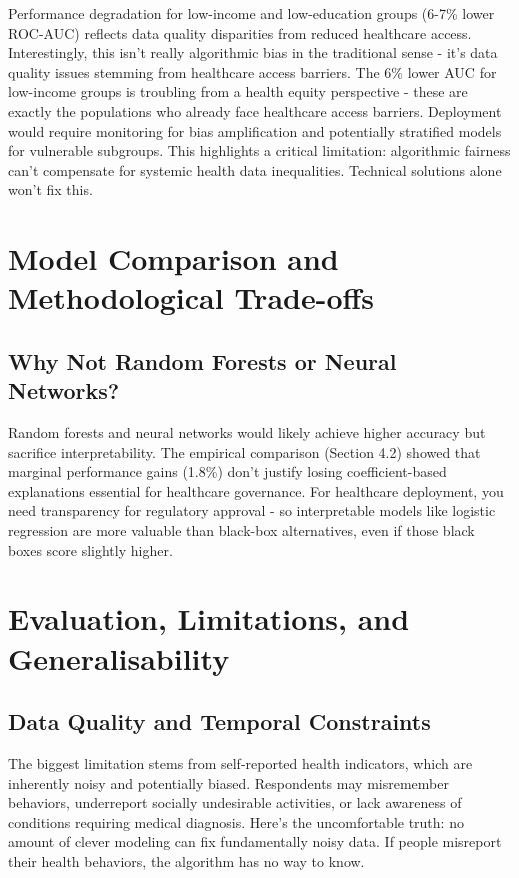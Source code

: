 \documentclass[12pt,a4paper]{article}
\begin{document}
Performance degradation for low-income and low-education groups (6-7\% lower ROC-AUC) reflects data quality disparities from reduced healthcare access. Interestingly, this isn't really algorithmic bias in the traditional sense - it's data quality issues stemming from healthcare access barriers. The 6\% lower AUC for low-income groups is troubling from a health equity perspective - these are exactly the populations who already face healthcare access barriers. Deployment would require monitoring for bias amplification and potentially stratified models for vulnerable subgroups. This highlights a critical limitation: algorithmic fairness can't compensate for systemic health data inequalities. Technical solutions alone won't fix this.

\section{Model Comparison and Methodological Trade-offs}

\subsection{Why Not Random Forests or Neural Networks?}

Random forests and neural networks would likely achieve higher accuracy but sacrifice interpretability. The empirical comparison (Section 4.2) showed that marginal performance gains (1.8\%) don't justify losing coefficient-based explanations essential for healthcare governance. For healthcare deployment, you need transparency for regulatory approval - so interpretable models like logistic regression are more valuable than black-box alternatives, even if those black boxes score slightly higher.


\section{Evaluation, Limitations, and Generalisability}

\subsection{Data Quality and Temporal Constraints}

The biggest limitation stems from self-reported health indicators, which are inherently noisy and potentially biased. Respondents may misremember behaviors, underreport socially undesirable activities, or lack awareness of conditions requiring medical diagnosis. Here's the uncomfortable truth: no amount of clever modeling can fix fundamentally noisy data. If people misreport their health behaviors, the algorithm has no way to know.
\end{document}
